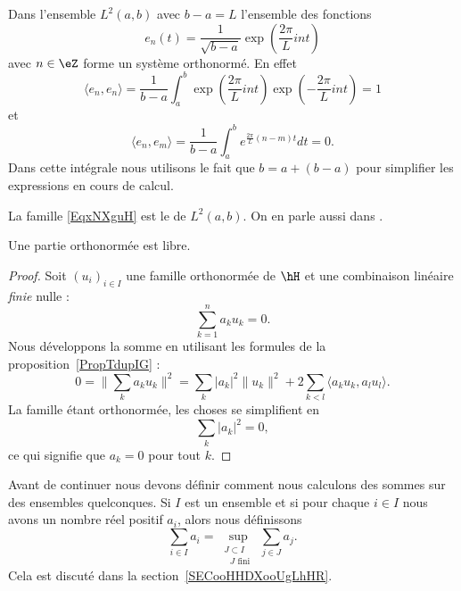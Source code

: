 \begin{example}
	Dans l'ensemble \( L^2(a,b)\) avec \( b-a=L\) l'ensemble des fonctions
	\begin{equation}        \label{EqxNXguH}
		e_n(t)=\frac{1}{ \sqrt{b-a} }\exp(\frac{ 2\pi }{ L }int)
	\end{equation}
	avec \( n\in \eZ\) forme un système orthonormé. En effet
	\begin{equation}
		\langle e_n, e_n\rangle =\frac{1}{ b-a }\int_a^b\exp(\frac{ 2\pi }{ L }int)\exp(-\frac{ 2\pi }{ L }int)=1
	\end{equation}
	et
	\begin{equation}
		\langle e_n, e_m\rangle =\frac{1}{ b-a }\int_a^b e^{\frac{ 2\pi }{ L }(n-m)t}dt=0.
	\end{equation}
	Dans cette intégrale nous utilisons le fait que \( b=a+(b-a)\) pour simplifier les expressions en cours de calcul.

	La famille \eqref{EqxNXguH} est le  de \( L^2(a,b)\). On en parle aussi dans \cite{KuttlerTopInAl}.
\end{example}

\begin{proposition}     \label{PROPooMOQRooCPFnPC}
	Une partie orthonormée est libre.
\end{proposition}

\begin{proof}
	Soit \( (u_i)_{i\in I}\) une famille orthonormée de \( \hH\) et une combinaison linéaire \emph{finie} nulle :
	\begin{equation}
		\sum_{k=1}^{n}a_ku_k=0.
	\end{equation}
	Nous développons la somme en utilisant les formules de la proposition~\ref{PropTdupIG} :
	\begin{equation}
		0=\| \sum_ka_ku_k \|^2=\sum_k| a_k |^2\| u_k \|^2+2\sum_{k<l}\langle a_ku_k, a_lu_l\rangle .
	\end{equation}
	La famille étant orthonormée, les choses se simplifient en
	\begin{equation}
		\sum_k| a_k |^2=0,
	\end{equation}
	ce qui signifie que \( a_k=0\) pour tout \( k\).
\end{proof}

Avant de continuer nous devons définir comment nous calculons des sommes sur des ensembles quelconques. Si \( I\) est un ensemble et si pour chaque \( i\in I\) nous avons un nombre réel positif \( a_i\), alors nous définissons
\begin{equation}
	\sum_{i\in I}a_i=\sup_{\substack{J\subset I\\\text{ } J\text{ fini }}}\sum_{j\in J} a_j.
\end{equation}
Cela est discuté dans la section~\ref{SECooHHDXooUgLhHR}.

